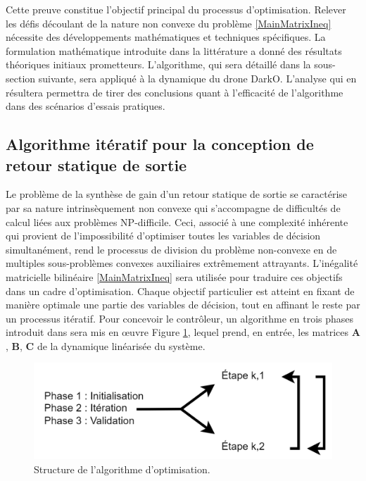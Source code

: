 Cette preuve constitue l'objectif principal du processus d'optimisation. Relever les défis découlant de la nature non convexe du problème \ref{MainMatrixIneq} nécessite des développements mathématiques et techniques spécifiques. La formulation mathématique introduite dans la littérature a donné des résultats théoriques initiaux prometteurs. L'algorithme, qui sera détaillé dans la sous-section suivante, sera appliqué à la dynamique du drone DarkO. L'analyse qui en résultera permettra de tirer des conclusions quant à l'efficacité de l'algorithme dans des scénarios d'essais pratiques.


\subsection{Algorithme itératif pour la conception de retour statique de sortie}
\label{3a}

Le problème de la synthèse de gain d'un retour statique de sortie se caractérise par sa nature intrinsèquement non convexe qui s'accompagne de difficultés de calcul liées aux problèmes NP-difficile. Ceci, associé à une complexité inhérente qui provient de l'impossibilité d'optimiser toutes les variables de décision simultanément, rend le processus de division du problème non-convexe en de multiples sous-problèmes convexes auxiliaires extrêmement attrayants. L'inégalité matricielle bilinéaire \eqref{MainMatrixIneq} sera utilisée pour traduire ces objectifs dans un cadre d'optimisation. Chaque objectif particulier est atteint en fixant de manière optimale une partie des variables de décision, tout en affinant le reste par un processus itératif. Pour concevoir le contrôleur, un algorithme en trois phases introduit dans \cite{Arzelier2018} sera mis en œuvre Figure \ref{AlgoPhases}, lequel prend, en entrée, les matrices $\boldsymbol{A}$, $\boldsymbol{B}$, $\boldsymbol{C}$ de la dynamique linéarisée du système.

\begin{figure}[hbt]
    \centering
      \includegraphics[width=0.6\columnwidth]{figures/LMIAlgo.png}
      \vspace{-0.2cm}\caption{Structure de l'algorithme d'optimisation.}
      \label{AlgoPhases}
\end{figure} 

